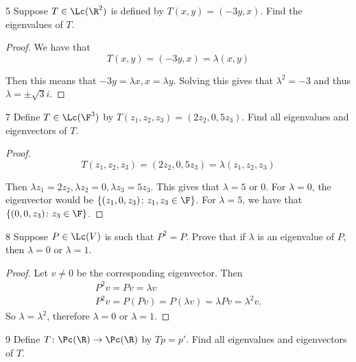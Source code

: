 \documentclass{extarticle}
\begin{document}
\begin{problem}{5}
    Suppose \(T \in \Lc(\R^2)\) is defined by \(T(x, y) = (-3y, x)\). Find the eigenvalues 
    of \(T\).
\end{problem}

\begin{proof}
We have that 
\[T(x, y) = (-3 y, x) = \lambda(x, y)\]

Then this means that \(-3y = \lambda x, x= \lambda y\). Solving this gives that \(\lambda^2 = -3\)
and thus \(\lambda = \pm \sqrt{3}i\). 
\end{proof}

\begin{problem}{7}
    Define \(T \in \Lc(\F^3)\) by \(T(z_1, z_2, z_3) = (2z_2, 0, 5z_3)\). Find all eigenvalues 
    and eigenvectors of \(T\).
\end{problem}

\begin{proof}
\[T(z_1, z_2, z_3) = (2z_2, 0, 5z_3) = \lambda(z_1, z_2, z_3)\]

Then \(\lambda z_1 = 2z_2, \lambda z_2 = 0, \lambda z_3 = 5 z_3\). This gives that \(\lambda=5 \text{ or } 0\).
For \(\lambda = 0\), the eigenvector would be \(\{(z_1, 0, z_3) \colon z_1, z_3 \in \F\}\). 
For \(\lambda = 5\), we have that \(\{(0, 0, z_3) \colon z_3 \in \F\}\). 
\end{proof}

\begin{problem}{8}
Suppose $ P \in \Lc(V) $ 
is such that $ P^{2} = P $. Prove that if $ \lambda $ is an eigenvalue of $ P $,
then $ \lambda = 0 $ or $ \lambda = 1 $.    
\end{problem}

\begin{proof}
    Let $ v \ne 0 $ be the corresponding eigenvector. Then
    \begin{gather*}
        P^2 v = P v = \lambda v \\ 
        P^2 v = P(P v) = P (\lambda v) = \lambda P v = \lambda^{2} v.
    \end{gather*}
    So $ \lambda = \lambda^{2} $, therefore $ \lambda = 0 $ or $ \lambda = 1 $.
    
\end{proof}

\begin{problem}{9}
    Define \(T \colon \Pc(\R) \to \Pc(\R)\) by \(Tp = p'\). Find all eigenvalues and 
    eigenvectors of \(T\).
\end{problem}
\end{document}
